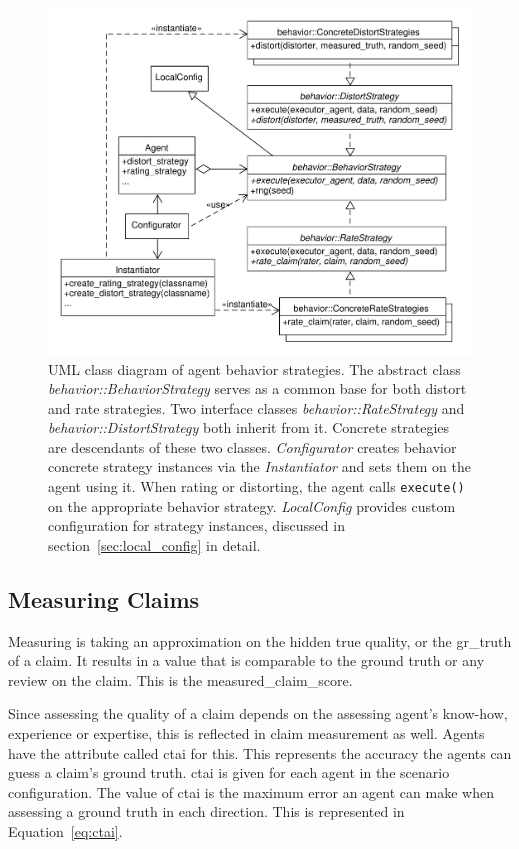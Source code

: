 \documentclass[%
    ]{\PathToTumTemplate/thesis/tum_thesis}
\begin{document}
\begin{figure}[tbp]
  \begin{center}
        \includegraphics[width=1\linewidth]	{../uml/behavior_strategies.pdf}
    \caption{
	UML class diagram of agent behavior strategies.
	The abstract class \emph{behavior::BehaviorStrategy} serves as a common base for both distort and rate strategies.
	Two interface classes \emph{behavior::RateStrategy} and \emph{behavior::DistortStrategy} both inherit from it.
	Concrete strategies are descendants of these two classes.
	\emph{Configurator} creates behavior concrete strategy instances via the \emph{Instantiator} and sets them on the agent using it.
	When rating or distorting, the agent calls \lstinline{execute()} on the appropriate behavior strategy.
	\emph{LocalConfig} provides custom configuration for strategy instances, discussed in section~\ref{sec:local_config} in detail.
    }
    \label{fig:behavior_strategies}
  \end{center}
\end{figure}


\subsection{Measuring Claims}
Measuring is taking an approximation on the hidden true quality, or the \gls{gr_truth} of a claim.
It results in a value that is comparable to the ground truth or any review on the claim.
This is the \gls{measured_claim_score}.

Since assessing the quality of a claim depends on the assessing agent's know-how, experience or expertise, this is reflected in claim measurement as well.
Agents have the attribute called \gls{ctai} for this.
This represents the accuracy the agents can guess a claim's ground truth.
\Gls{ctai} is given for each agent in the scenario configuration.
The value of \gls{ctai} is the maximum error an agent can make when assessing a ground truth in each direction.
This is represented in Equation~\ref{eq:ctai}.
\end{document}
